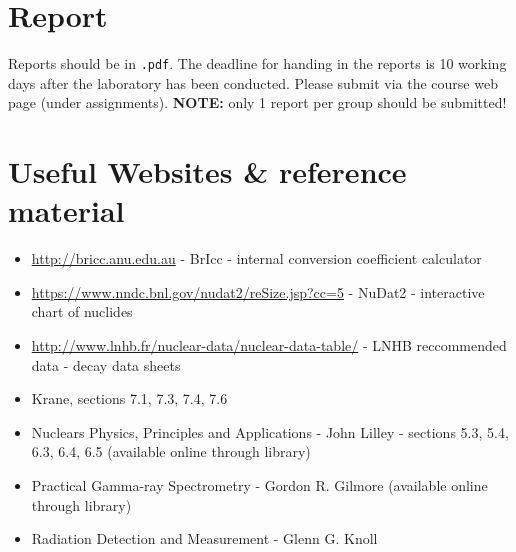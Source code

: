 \documentclass[12pt]{article}
\begin{document}
\section*{Report}
Reports should be in \texttt{.pdf}. The deadline for handing in the reports is 10 working days after the laboratory has been conducted.
Please submit via the course web page (under assignments).
{\bf NOTE:} only 1 report per group should be submitted!

\pagebreak
\section*{Useful Websites \& reference material}
\begin{itemize}
    \item \href{http://bricc.anu.edu.au}{http://bricc.anu.edu.au} - BrIcc - internal conversion coefficient calculator
    \item \href{https://www.nndc.bnl.gov/nudat2/reSize.jsp?cc=5}{https://www.nndc.bnl.gov/nudat2/reSize.jsp?cc=5} - NuDat2 - interactive chart of nuclides
    \item \href{http://www.lnhb.fr/nuclear-data/nuclear-data-table}{http://www.lnhb.fr/nuclear-data/nuclear-data-table/} - LNHB reccommended data - decay data sheets
    \item Krane, sections 7.1, 7.3, 7.4, 7.6
    \item Nuclears Physics, Principles and Applications - John Lilley - sections 5.3, 5.4, 6.3, 6.4, 6.5 (available online through library)
    \item Practical Gamma-ray Spectrometry - Gordon R. Gilmore (available online through library)
    \item Radiation Detection and Measurement - Glenn G. Knoll
\end{itemize}
\end{document}
